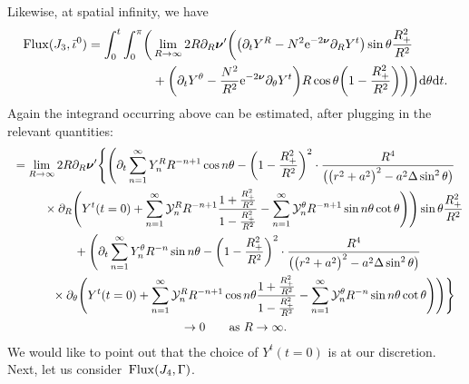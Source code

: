 \documentclass[pdftex]{sigma}
\def\ptl{\partial}%
\def\mbo#1{\boldsymbol{#1}}%
\numberwithin{equation}{section}
\begin{document}
Likewise, at spatial infinity, we have
\begin{align*}
{\rm Flux} (J_3, \bar{\iota}^0)= \int^t_0 \int^\pi _0 \biggl(&\lim_{R \to \infty} 2 R \ptl_R \mbo{\nu}' \biggl(\bigl(\ptl_t Y^R - N^2 {\rm e}^{-2 \mbo{\nu}} \ptl_R Y^t\bigr) \sin \theta \frac{R^2_+}{R^2} \notag\\
&{} + \biggl(\ptl_t Y^\theta - \frac{N^2}{R^2} {\rm e}^{-2 \mbo{\nu}} \ptl_\theta Y^t\biggr) R \cos \theta \biggl(1-\frac{R^2_+}{R^2}\biggr) \biggr) \biggr) {\rm d}\theta {\rm d}t.
\end{align*}
Again the integrand occurring above can be estimated, after plugging in the relevant quantities:
\begin{gather*}
= \lim_{R \to \infty} 2R \ptl_R \mbo{\nu}' \Bigg\{ \Biggl(\ptl_t \sum^\infty_{n=1} Y^R_n R^{-n+1} \cos n \theta - \biggl(1 - \frac{R^2_+}{R^2} \biggr)^2 \cdot \frac{R^4}{ \bigl( \bigl(r^2+a^2\bigr)^2 -a^2 \Delta \sin^2 \theta\bigr)} \\
 \qquad\quad{} \times \ptl_R \Biggl(Y^t(t=0) + \sum^\infty_{n =1} \mathcal{Y}^R_n R^{-n+1} \frac{1+ \frac{R^2_+}{R^2}}{1-\frac{R^2_+}{R^2}} - \sum^\infty_{n=1} \mathcal{Y}^\theta_n R^{-n+1} \sin n \theta \cot \theta \Biggr) \Biggr)\sin \theta \frac{R^2_+}{R^2} \notag\\
 \qquad{} + \Biggl( \ptl_t \sum^{\infty}_{n=1} Y^\theta_n R^{-n} \sin n \theta - \biggl(1- \frac{R^2_+}{R^2}\biggr)^2 \cdot \frac{R^4}{ \bigl(\bigl(r^2+a^2\bigr)^2 -a^2 \Delta
	\sin^2 \theta \bigr)} \notag\\
 \qquad\quad{} \times \ptl_\theta \Biggl(Y^t (t=0) + \sum^\infty_{n=1} \mathcal{Y}^R_n R^{-n+1} \cos n \theta \frac{1 + \frac{R^2_+}{R^2}} {{1-\frac{R^2_+}{R^2}} } - \sum^\infty_{n=1} \mathcal{Y}^\theta_n R^{-n} \sin n \theta \cot \theta \Biggr) \Biggr) \Bigg\} \notag\\
 \to 0 \qquad \text{as} \ R \to \infty.
\end{gather*}
We would like to point out that the choice of $Y^t(t=0)$ is at our discretion.
Next, let us consider~${\rm Flux} (J_4, \Gamma)$.
\end{document}
